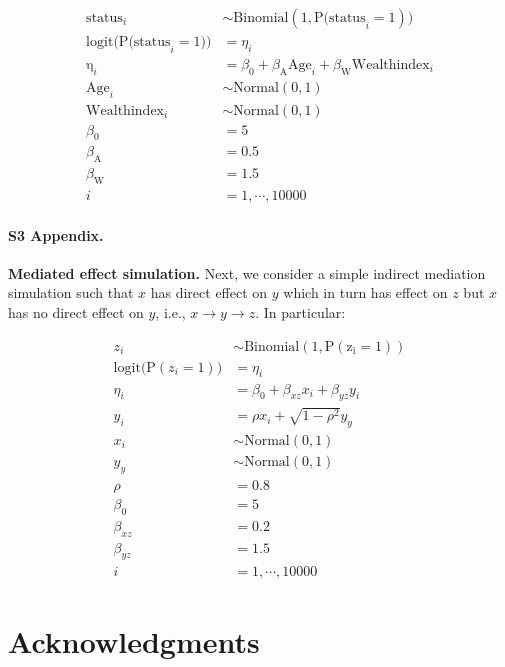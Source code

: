 \documentclass[10pt,letterpaper]{article}
\begin{document}
\begin{align}\label{sim:glm_two_pred}
\mathrm{status}_i &\sim \mathrm{Binomial}(1, \mathrm{P(status}_i = 1)) \nonumber\\
\mathrm{logit(P(status}_i = 1)) &= \eta_i \nonumber\\
\mathrm{\eta}_i &= \beta_0 + \beta_{\mathrm{A}}\mathrm{Age}_i + \beta_{\mathrm{W}}\mathrm{Wealthindex}_i \nonumber\\
\mathrm{Age}_i &\sim \mathrm{Normal}(0, 1) \nonumber\\
\mathrm{Wealthindex}_i &\sim \mathrm{Normal}(0, 1) \nonumber\\
\beta_0 &= 5 \nonumber\\
\beta_{\mathrm{A}} &= 0.5 \nonumber\\
\beta_{\mathrm{W}} &= 1.5 \nonumber\\
i &= 1,\cdots, 10000
\end{align}

\paragraph*{S3 Appendix.}
\label{S3_Appendix}
{\bf Mediated effect simulation.} Next, we consider a simple indirect mediation simulation such that $x$ has direct effect on $y$ which in turn has effect on $z$ but $x$ has no direct effect on $y$, i.e., $x \rightarrow y \rightarrow z$. In particular:

\begin{align}\label{sim:simple_mediate}
z_i &\sim \mathrm{Binomial(1, P(z_i = 1))} \nonumber\\
\mathrm{logit(P}(z_i = 1)) &= \eta_i \nonumber\\
\eta_i &= \beta_0 + \beta_{xz} x_i + \beta_{yz} y_i \nonumber\\
y_i &= \rho x_i + \sqrt{1-\rho^2} y_y \nonumber\\
x_i &\sim \mathrm{Normal(0, 1)} \nonumber\\
y_y &\sim \mathrm{Normal(0, 1)} \nonumber\\
\rho &= 0.8 \nonumber\\
\beta_0 &= 5 \nonumber\\
\beta_{xz} &= 0.2 \nonumber\\
\beta_{yz} &= 1.5 \nonumber\\
i &= 1,\cdots, 10000
\end{align}


\section*{Acknowledgments}
\end{document}
